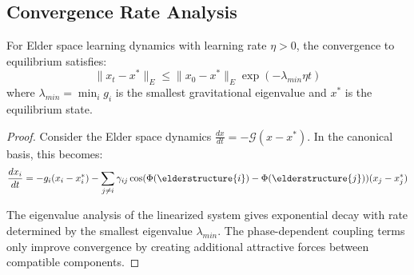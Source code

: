 \subsection{Convergence Rate Analysis}

\begin{theorem}
For Elder space learning dynamics with learning rate $\eta > 0$, the convergence to equilibrium satisfies:
\begin{equation}
\|x_t - x^*\|_E \leq \|x_0 - x^*\|_E \exp(-\lambda_{min} \eta t)
\end{equation}
where $\lambda_{min} = \min_i g_i$ is the smallest gravitational eigenvalue and $x^*$ is the equilibrium state.
\end{theorem}

\begin{proof}
Consider the Elder space dynamics $\frac{dx}{dt} = -\mathcal{G}(x - x^*)$. In the canonical basis, this becomes:
\begin{equation}
\frac{dx_i}{dt} = -g_i (x_i - x_i^*) - \sum_{j \neq i} \gamma_{ij} \cos(\Phi(\elderstructure{i}) - \Phi(\elderstructure{j}))(x_j - x_j^*)
\end{equation}

The eigenvalue analysis of the linearized system gives exponential decay with rate determined by the smallest eigenvalue $\lambda_{min}$. The phase-dependent coupling terms only improve convergence by creating additional attractive forces between compatible components.
\end{proof}